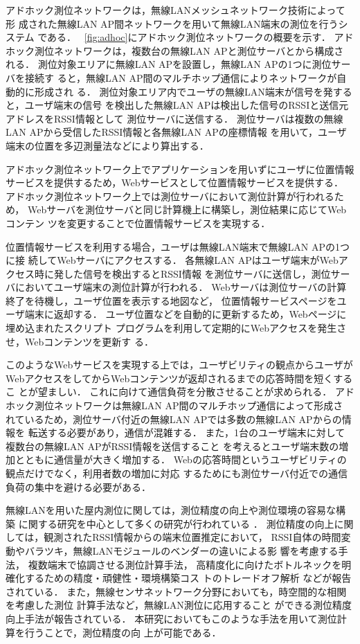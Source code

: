 \documentclass[technicalreport]{ieicej}
\begin{document}
アドホック測位ネットワークは，無線LANメッシュネットワーク技術によって形
成された無線LAN AP間ネットワークを用いて無線LAN端末の測位を行うシステム
である．
\figurename~\ref{fig:adhoc}にアドホック測位ネットワークの概要を示す．
アドホック測位ネットワークは，複数台の無線LAN APと測位サーバとから構成さ
れる．
測位対象エリアに無線LAN APを設置し，無線LAN APの1つに測位サーバを接続す
ると，無線LAN AP間のマルチホップ通信によりネットワークが自動的に形成され
る．
測位対象エリア内でユーザの無線LAN端末が信号を発すると，ユーザ端末の信号
を検出した無線LAN APは検出した信号のRSSIと送信元アドレスをRSSI情報として
測位サーバに送信する．
測位サーバは複数の無線LAN APから受信したRSSI情報と各無線LAN APの座標情報
を用いて，ユーザ端末の位置を多辺測量法などにより算出する．

アドホック測位ネットワーク上でアプリケーションを用いずにユーザに位置情報
サービスを提供するため，Webサービスとして位置情報サービスを提供する．
アドホック測位ネットワーク上では測位サーバにおいて測位計算が行われるため，
Webサーバを測位サーバと同じ計算機上に構築し，測位結果に応じてWebコンテン
ツを変更することで位置情報サービスを実現する．

位置情報サービスを利用する場合，ユーザは無線LAN端末で無線LAN APの1つに接
続してWebサーバにアクセスする．
各無線LAN APはユーザ端末がWebアクセス時に発した信号を検出するとRSSI情報
を測位サーバに送信し，測位サーバにおいてユーザ端末の測位計算が行われる．
Webサーバは測位サーバの計算終了を待機し，ユーザ位置を表示する地図など，
位置情報サービスページをユーザ端末に返却する．
ユーザ位置などを自動的に更新するため，Webページに埋め込まれたスクリプト
プログラムを利用して定期的にWebアクセスを発生させ，Webコンテンツを更新す
る．

このようなWebサービスを実現する上では，ユーザビリティの観点からユーザが
WebアクセスをしてからWebコンテンツが返却されるまでの応答時間を短くするこ
とが望ましい．
これに向けて通信負荷を分散させることが求められる．
アドホック測位ネットワークは無線LAN AP間のマルチホップ通信によって形成さ
れているため，測位サーバ付近の無線LAN APでは多数の無線LAN APからの情報を
転送する必要があり，通信が混雑する．
また，1台のユーザ端末に対して複数台の無線LAN APがRSSI情報を送信すること
を考えるとユーザ端末数の増加とともに通信量が大きく増加する．
Webの応答時間というユーザビリティの観点だけでなく，利用者数の増加に対応
するためにも測位サーバ付近での通信負荷の集中を避ける必要がある．

無線LANを用いた屋内測位に関しては，測位精度の向上や測位環境の容易な構築
に関する研究を中心として多くの研究が行われている
\cite{sun05:sig_proc_pos}．
測位精度の向上に関しては，観測されたRSSI情報からの端末位置推定において，
RSSI自体の時間変動やバラツキ，無線LANモジュールのベンダーの違いによる影
響を考慮する手法\cite{kaemarungsi12:wlan_rssi_analysis}，
複数端末で協調させる測位計算手法\cite{wymeersch09:coop_loc}，
高精度化に向けたボトルネックを明確化するための精度・頑健性・環境構築コス
トのトレードオフ解析\cite{prasithsangaree02:indoor_wlan_loc}
などが報告されている．
また，無線センサネットワーク分野においても，時空間的な相関を考慮した測位
計算手法\cite{blumrosen13:rssi_track_wsn}など，無線LAN測位に応用すること
ができる測位精度向上手法が報告されている．
本研究においてもこのような手法を用いて測位計算を行うことで，測位精度の向
上が可能である．
\end{document}
